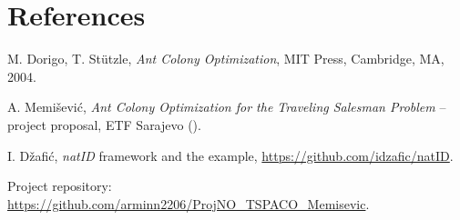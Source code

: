 \documentclass[11pt,a4paper]{article}
\begin{document}
\section*{References}
\begin{enumerate}[label={[\arabic*]}]
  \item M. Dorigo, T. Stützle, \emph{Ant Colony Optimization}, MIT Press, Cambridge, MA, 2004.
  \item A. Memišević, \emph{Ant Colony Optimization for the Traveling Salesman Problem} -- project proposal,
        ETF Sarajevo ().
  \item I. Džafić, \emph{natID} framework and the  example,
        \url{https://github.com/idzafic/natID}.
  \item Project repository: \url{https://github.com/arminn2206/ProjNO_TSPACO_Memisevic}.
\end{enumerate}
\end{document}
